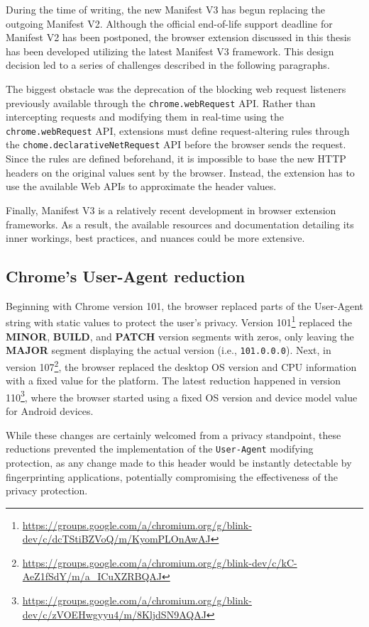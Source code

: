 During the time of writing, the new Manifest V3 has begun replacing the outgoing Manifest V2. Although the official end-of-life support deadline for Manifest V2 has been postponed, the browser extension discussed in this thesis has been developed utilizing the latest Manifest V3 framework. This design decision led to a series of challenges described in the following paragraphs.

The biggest obstacle was the deprecation of the blocking web request listeners previously available through the \texttt{chrome.webRequest} API. Rather than intercepting requests and modifying them in real-time using the \texttt{chrome.webRequest} API, extensions must define request-altering rules through the \texttt{chome.declarativeNetRequest} API before the browser sends the request. Since the rules are defined beforehand, it is impossible to base the new HTTP headers on the original values sent by the browser. Instead, the extension has to use the available Web APIs to approximate the header values.


Finally, Manifest V3 is a relatively recent development in browser extension frameworks. As a result, the available resources and documentation detailing its inner workings, best practices, and nuances could be more extensive.

\subsection{Chrome's User-Agent reduction}

Beginning with Chrome version 101, the browser replaced parts of the User-Agent string with static values to protect the user's privacy. Version 101\footnote{\url{https://groups.google.com/a/chromium.org/g/blink-dev/c/dcTStiBZVoQ/m/KyomPLOnAwAJ}} replaced the \textbf{MINOR}, \textbf{BUILD}, and \textbf{PATCH} version segments with zeros, only leaving the \textbf{MAJOR} segment displaying the actual version (i.e., \texttt{101.0.0.0}). Next, in version 107\footnote{\url{https://groups.google.com/a/chromium.org/g/blink-dev/c/kC-AeZ1fSdY/m/a_ICuXZRBQAJ}}, the browser replaced the desktop OS version and CPU information with a fixed value for the platform. The latest reduction happened in version 110\footnote{\url{https://groups.google.com/a/chromium.org/g/blink-dev/c/zVOEHwgyyu4/m/8KljdSN9AQAJ}}, where the browser started using a fixed OS version and device model value for Android devices.

While these changes are certainly welcomed from a privacy standpoint, these reductions prevented the implementation of the \texttt{User-Agent} modifying protection, as any change made to this header would be instantly detectable by fingerprinting applications, potentially compromising the effectiveness of the privacy protection.



% 